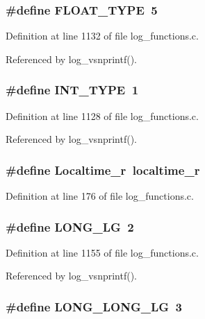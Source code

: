 \subsubsection{\setlength{\rightskip}{0pt plus 5cm}\#define FLOAT\_\-TYPE\ 5}\label{log__functions_8c_a14}




Definition at line 1132 of file log\_\-functions.c.

Referenced by log\_\-vsnprintf().
\subsubsection{\setlength{\rightskip}{0pt plus 5cm}\#define INT\_\-TYPE\ 1}\label{log__functions_8c_a10}




Definition at line 1128 of file log\_\-functions.c.

Referenced by log\_\-vsnprintf().
\subsubsection{\setlength{\rightskip}{0pt plus 5cm}\#define Localtime\_\-r\ localtime\_\-r}\label{log__functions_8c_a7}




Definition at line 176 of file log\_\-functions.c.
\subsubsection{\setlength{\rightskip}{0pt plus 5cm}\#define LONG\_\-LG\ 2}\label{log__functions_8c_a32}




Definition at line 1155 of file log\_\-functions.c.

Referenced by log\_\-vsnprintf().
\subsubsection{\setlength{\rightskip}{0pt plus 5cm}\#define LONG\_\-LONG\_\-LG\ 3}\label{log__functions_8c_a33}




